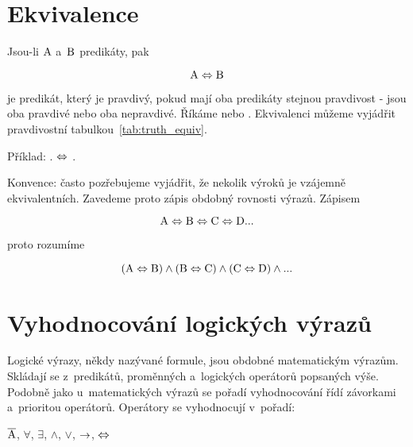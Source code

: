 \section{Ekvivalence}

Jsou-li \(\mathrm{A}\) a~\(\mathrm{B}\) predikáty, pak

\begin{equation}
\mathrm{A} \Leftrightarrow \mathrm{B} 
\end{equation}

je predikát, který je pravdivý, pokud mají oba predikáty stejnou pravdivost - jsou oba pravdivé nebo oba nepravdivé. Říkáme  nebo .
Ekvivalenci můžeme vyjádřit pravdivostní tabulkou~\ref{tab:truth_equiv}.


Příklad: .  \(\Leftrightarrow\) .

Konvence: často pozřebujeme vyjádřit, že nekolik výroků je vzájemně ekvivalentních. Zavedeme proto zápis obdobný rovnosti výrazů. Zápisem

\begin{equation}
\mathrm{A} \Leftrightarrow \mathrm{B} \Leftrightarrow \mathrm{C} \Leftrightarrow \mathrm{D} ... 
\end{equation}

proto rozumíme

\begin{equation}
(\mathrm{A} \Leftrightarrow \mathrm{B}) \land (\mathrm{B} \Leftrightarrow \mathrm{C}) \land (\mathrm{C} \Leftrightarrow \mathrm{D}) \land ... 
\end{equation}

\section{Vyhodnocování logických výrazů}

Logické výrazy, někdy nazývané formule, jsou obdobné matematickým výrazům. Skládají se z~predikátů, proměnných a~logických operátorů popsaných výše. Podobně jako u~matematických výrazů se pořadí vyhodnocování řídí závorkami a~prioritou operátorů. Operátory se vyhodnocují v~pořadí:

\(\overline{\mathrm{A}}\), \(\forall\), \(\exists\), \(\land\), \(\lor\), \(\rightarrow\), \(\Leftrightarrow\)

